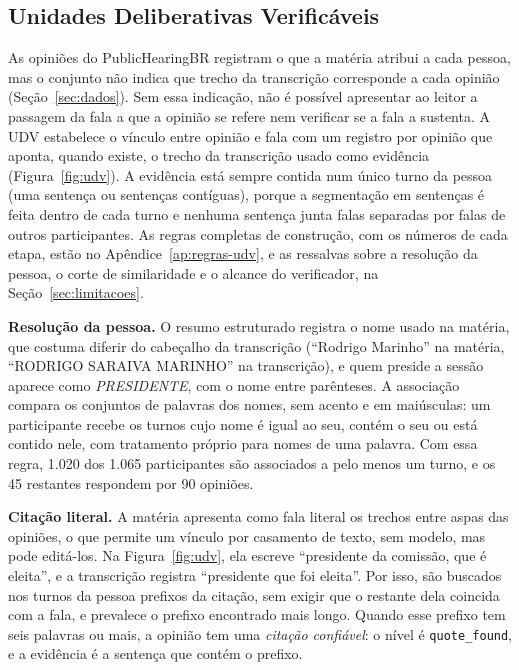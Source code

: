 \subsection{Unidades Deliberativas Verificáveis}
\label{sec:metodo-udv}

As opiniões do PublicHearingBR registram o que a matéria atribui a cada pessoa, mas o conjunto não
indica que trecho da transcrição corresponde a cada opinião (Seção~\ref{sec:dados}). Sem essa
indicação, não é possível apresentar ao leitor a passagem da fala a que a opinião se refere nem
verificar se a fala a sustenta. A UDV estabelece o vínculo entre opinião e fala com um registro por
opinião que aponta, quando existe, o trecho da transcrição usado como evidência
(Figura~\ref{fig:udv}). A evidência está sempre contida num único turno da pessoa (uma sentença ou
sentenças contíguas), porque a segmentação em sentenças é feita dentro de cada turno e nenhuma
sentença junta falas separadas por falas de outros participantes. As regras completas de construção,
com os números de cada etapa, estão no Apêndice~\ref{ap:regras-udv}, e as ressalvas sobre a
resolução da pessoa, o corte de similaridade e o alcance do verificador, na
Seção~\ref{sec:limitacoes}.

\textbf{Resolução da pessoa.} O resumo estruturado registra o nome usado na matéria, que costuma
diferir do cabeçalho da transcrição (``Rodrigo Marinho'' na matéria, ``RODRIGO SARAIVA MARINHO'' na
transcrição), e quem preside a sessão aparece como \textit{PRESIDENTE}, com o nome entre parênteses.
A associação compara os conjuntos de palavras dos nomes, sem acento e em maiúsculas: um participante
recebe os turnos cujo nome é igual ao seu, contém o seu ou está contido nele, com tratamento próprio
para nomes de uma palavra. Com essa regra, 1.020 dos 1.065 participantes são associados a pelo menos
um turno, e os 45 restantes respondem por 90 opiniões.



\textbf{Citação literal.} A matéria apresenta como fala literal os trechos entre aspas das opiniões,
o que permite um vínculo por casamento de texto, sem modelo, mas pode editá-los. Na
Figura~\ref{fig:udv}, ela escreve ``presidente da comissão, que é eleita'', e a transcrição registra
``presidente que foi eleita''. Por isso, são buscados nos turnos da pessoa prefixos da citação, sem
exigir que o restante dela coincida com a fala, e prevalece o prefixo encontrado mais longo. Quando
esse prefixo tem seis palavras ou mais, a opinião tem uma \emph{citação confiável}: o nível é
\texttt{quote\_found}, e a evidência é a sentença que contém o prefixo.

